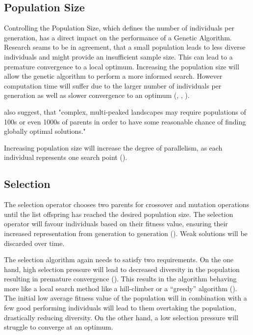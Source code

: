 \subsection{Population Size}
Controlling the Population Size, which defines the number of individuals per generation, has a direct impact on the performance of a Genetic Algorithm.
Research seams to be in agreement, that a small population leads to less diverse individuals and might provide an insufficient sample size. This can lead to a premature convergence to a local optimum.
Increasing the population size will allow the genetic algorithm to perform a more informed search. However computation time will suffer due to the larger number of individuals per generation as well as slower convergence to an optimum (\cite{grefenstette_optimization_1986}, \cite{katoch_review_2021}, \cite{kacprzyk_parameter_2007}).

\cite{kacprzyk_parameter_2007} also suggest, that "complex, multi-peaked landscapes may require populations of 100s or even 1000s of parents in order to have some reasonable chance of finding globally optimal solutions."

Increasing population size will increase the degree of parallelism, as each individual represents one search point (\cite{mills_determining_2015}).

\subsection{Selection}
The selection operator chooses two parents for crossover and mutation operations until the list offspring has reached the desired population size. 
The selection operator will favour individuals based on their fitness value, ensuring their increased representation from generation to generation (\cite{srinivas_genetic_1994}). Weak solutions will be discarded over time.

The selection algorithm again needs to satisfy two requirements. On the one hand, high selection pressure will lead to decreased diversity in the population resulting in premature convergence (\cite{katoch_review_2021}). This results in the algorithm behaving more like a local search method like a hill-climber or a “greedy” algorithm (\cite{kacprzyk_parameter_2007}).
The initial low average fitness value of the population will in combination with a few good performing individuals will lead to them overtaking the population, drastically reducing diversity.
On the other hand, a low selection pressure will struggle to converge at an optimum.

